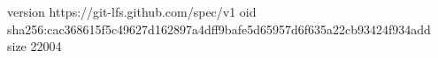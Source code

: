 version https://git-lfs.github.com/spec/v1
oid sha256:cac368615f5c49627d162897a4dff9bafe5d65957d6f635a22cb93424f934add
size 22004
